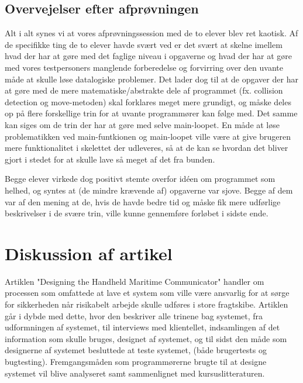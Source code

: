 \documentclass[10pt,a4paper,danish]{article}
\begin{document}
\subsection{Overvejelser efter afprøvningen}
Alt i alt synes vi at vores afprøvningssession med de to elever blev ret kaotisk.
Af de specifikke ting de to elever havde svært ved er det svært at skelne imellem
hvad der har at gøre med det faglige niveau i opgaverne og hvad der har at gøre med
vores testpersoners manglende forberedelse og forvirring over den uvante måde at 
skulle løse datalogiske problemer. Det lader dog til at de opgaver der har at gøre
med de mere matematiske/abstrakte dele af programmet (fx. collision detection og move-metoden)
skal forklares meget mere grundigt, og måske deles op på flere forskellige trin for
at uvante programmører kan følge med. Det samme kan siges om de trin der har at gøre 
med selve main-loopet. En måde at løse problematikken ved main-funtkionen og main-loopet
ville være at give brugeren mere funktionalitet i skelettet der udleveres, så at 
de kan se hvordan det bliver gjort i stedet for at skulle lave så meget af det
fra bunden. 

Begge elever virkede dog positivt stemte overfor idéen om programmet som helhed, 
og syntes at (de mindre krævende af) opgaverne var sjove. Begge af dem var af den 
mening at de, hvis de havde bedre tid og måske fik mere udførlige beskrivelser i de 
svære trin, ville kunne gennemføre forløbet i sidste ende. 

\section{Diskussion af artikel}
Artiklen "Designing the Handheld Maritime Communicator" handler om processen som omfattede at
lave et system som ville være ansvarlig for at sørge for sikkerheden når risikabelt arbejde skulle udføres 
i store fragtskibe. Artiklen går i dybde med dette, hvor den beskriver alle trinene bag systemet, fra 
udformningen af systemet, til interviews med klientellet, indsamlingen af det information som skulle 
bruges, designet af systemet, og til sidst den måde som designerne af systemet besluttede at teste systemet, 
(både brugertests og bugtesting). Fremgangsmåden som programmørerne brugte til at designe systemet vil blive 
analyseret samt sammenlignet med kursuslitteraturen.
\end{document}
